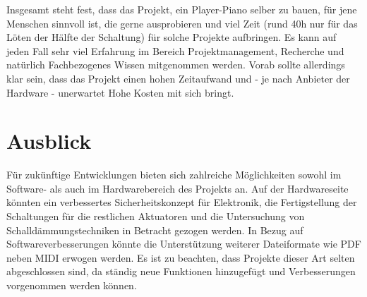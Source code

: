 Insgesamt steht fest, dass das Projekt, ein Player-Piano selber zu bauen, für jene Menschen sinnvoll ist, die gerne ausprobieren und viel Zeit (rund 40h nur für das Löten der Hälfte der Schaltung) für solche Projekte aufbringen. %
Es kann auf jeden Fall sehr viel Erfahrung im Bereich Projektmanagement, Recherche und natürlich Fachbezogenes Wissen mitgenommen werden. %
Vorab sollte allerdings klar sein, dass das Projekt einen hohen Zeitaufwand und - je nach Anbieter der Hardware - unerwartet Hohe Kosten mit sich bringt.


\section{Ausblick}

Für zukünftige Entwicklungen bieten sich zahlreiche Möglichkeiten sowohl im Software- als auch im Hardwarebereich des Projekts an.
Auf der Hardwareseite könnten ein verbessertes Sicherheitskonzept für Elektronik, die Fertigstellung der Schaltungen für die restlichen Aktuatoren und die Untersuchung von Schalldämmungstechniken in Betracht gezogen werden.
In Bezug auf Softwareverbesserungen könnte die Unterstützung weiterer Dateiformate wie PDF neben MIDI erwogen werden.
Es ist zu beachten, dass Projekte dieser Art selten abgeschlossen sind, da ständig neue Funktionen hinzugefügt und Verbesserungen vorgenommen werden können.

